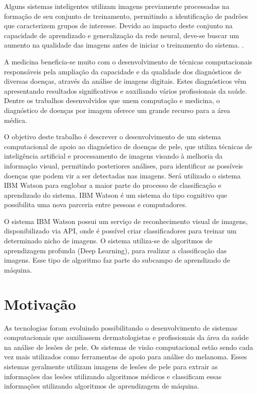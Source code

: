 \documentclass[openright]{ifrs} %
\begin{document}
Alguns sistemas inteligentes utilizam imagens previamente processadas na
formação de seu conjunto de treinamento,
permitindo a identificação de padrões que caracterizem grupos de interesse.
Devido ao impacto deste conjunto na capacidade de aprendizado e generalização da rede neural, deve-se buscar um aumento na qualidade das imagens antes de iniciar o 
treinamento do sistema. \cite{haykin2001redes}.

A medicina beneficia-se muito com o desenvolvimento de técnicas computacionais responsáveis pela ampliação da capacidade e da qualidade dos diagnósticos de diversas doenças, através da análise de imagens digitais. Estes diagnósticos vêm apresentando resultados significativos e auxiliando vários profissionais da saúde. Dentre os trabalhos desenvolvidos que unem computação e medicina, o diagnóstico de doenças por imagem oferece um grande recurso para a área médica.

O objetivo deste trabalho é descrever o desenvolvimento de um sistema computacional de apoio ao diagnóstico de doenças de pele, que utiliza técnicas de inteligência artificial e processamento de imagens visando à melhoria da informação visual, permitindo posteriores análises, para identificar as possíveis doenças que podem vir a ser detectadas nas imagens. Será utilizado o sistema IBM Watson para englobar a maior parte do processo de classificação e aprendizado do sistema. IBM Watson é um sistema do tipo cognitivo que possibilita uma nova parceria entre pessoas e computadores.

O sistema IBM Watson possui um serviço de  reconhecimento visual de imagens, disponibilizado via API, onde é possível criar classificadores para treinar um determinado nicho de imagens. O sistema utiliza-se de algoritmos de aprendizagem profunda (Deep Learning), para realizar a classificação das imagens. Esse tipo de algoritmo faz parte do subcampo de aprendizado de máquina.


\section{Motivação}
As tecnologias foram evoluindo possibilitando o desenvolvimento de sistemas computacionais que auxiliassem dermatologistas e profissionais da área da saúde na análise de lesões de pele. Os sistemas de visão computacional estão sendo cada vez mais utilizados como ferramentas de apoio para análise do melanoma. Esses sistemas geralmente utilizam imagens de lesões de pele para extrair as informações das lesões utilizando algoritmos médicos e classificam essas informações utilizando algoritmos de aprendizagem de máquina.
\end{document}
